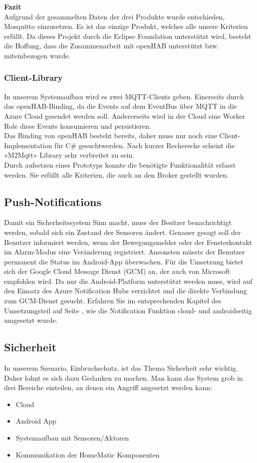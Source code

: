 \textbf{Fazit} \\
Aufgrund der gesammelten Daten der drei Produkte wurde entschieden, Mosquitto einzusetzen. Es ist das einzige Produkt, welches alle unsere Kriterien erfüllt. Da dieses Projekt durch die Eclipse Foundation unterstützt wird, besteht die Hoffung, dass die Zusammenarbeit mit openHAB unterstützt bzw. miteinbezogen wurde.

\subsubsection{Client-Library}
In unserem Systemaufbau wird es zwei MQTT-Clients geben. Einerseits durch das openHAB-Binding, da die Events auf dem EventBus über MQTT in die Azure Cloud gesendet werden soll. Andererseits wird in der Cloud eine Worker Role diese Events konsumieren und persistieren. \\
Das Binding von openHAB besteht bereits, daher muss nur noch eine Client-Implementation für C\# gesuchtwerden. Nach kurzer Rechereche scheint die «M2Mqtt» Library sehr verbreitet zu sein. \\
Durch aufsetzen eines Prototyps konnte die benötigte Funktionalität erfasst werden. Sie erfüllt alle Kriterien, die auch an den Broker gestellt wurden.

\subsection{Push-Notifications}
Damit ein Sicherheitssystem Sinn macht, muss der Besitzer benachrichtigt werden, sobald sich ein Zustand der Sensoren ändert. Genauer gesagt soll der Benutzer informiert werden, wenn der Bewegungsmelder oder der Fensterkontakt im Alarm-Modus eine Veränderung registriert. Ansonsten müsste der Benutzer permanent die Status im Android-App überwachen. Für die Umsetzung bietet sich der Google Cloud Message Dienst (GCM) an, der auch von Microsoft empfohlen wird. Da nur die Android-Platform unterstützt werden muss, wird auf den Einsatz des Azure Notification Hubs verzichtet und die direkte Verbindung zum GCM-Dienst gesucht. Erfahren Sie im entsprechenden Kapitel des Umsetzungsteil auf Seite \pageref{sec:notificationRealization}, wie die Notification Funktion cloud- und androidseitig umgesetzt wurde.

\subsection{Sicherheit}
In unserem Szenario, Einbruchschutz, ist das Thema Sicherheit sehr wichtig. Daher lohnt es sich dazu  Gedanken zu machen. Man kann das System grob in drei Bereiche einteilen, an denen ein Angriff angesetzt werden kann:
\begin{itemize}
	\item Cloud
	\item Android App
	\item Systemaufbau mit Sensoren/Aktoren
	\item Kommunikation der HomeMatic Komponenten
\end{itemize}

